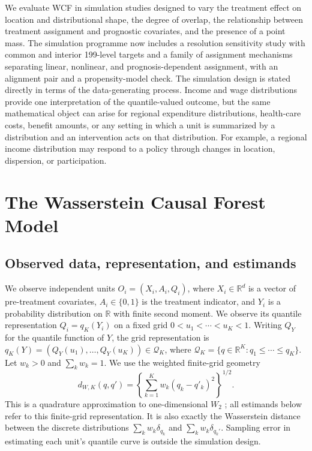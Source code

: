 \documentclass[11pt]{article}
\begin{document}
We evaluate WCF in simulation studies designed to vary the treatment effect on location and distributional shape, the degree of overlap, the relationship between treatment assignment and prognostic covariates, and the presence of a point mass. The simulation programme now includes a resolution sensitivity study with common and interior 199-level targets and a family of assignment mechanisms separating linear, nonlinear, and prognosis-dependent assignment, with an alignment pair and a propensity-model check. The simulation design is stated directly in terms of the data-generating process. Income and wage distributions provide one interpretation of the quantile-valued outcome, but the same mathematical object can arise for regional expenditure distributions, health-care costs, benefit amounts, or any setting in which a unit is summarized by a distribution and an intervention acts on that distribution. For example, a regional income distribution may respond to a policy through changes in location, dispersion, or participation.

\section{The Wasserstein Causal Forest Model}\label{sec:model}

\subsection{Observed data, representation, and estimands}\label{sec:setup}

We observe independent units $O_i=(X_i,A_i,Q_i)$, where $X_i\in
\mathbb{R}^{d}$ is a vector of pre-treatment covariates, $A_i\in\{0,1\}$ is
the treatment indicator, and $Y_i$ is a probability distribution on $\mathbb{R}$ with finite second moment. We observe its quantile representation $Q_i=q_K(Y_i)$ on a
fixed grid $0<u_1<\cdots<u_K<1$. Writing $Q_Y$ for the quantile function of $Y$, the grid representation is
$q_K(Y)=(Q_Y(u_1),\ldots,Q_Y(u_K))\in\mathcal{Q}_K$, where
$\mathcal{Q}_K=\{q\in\mathbb{R}^K:q_1\leq\cdots\leq q_K\}$. Let
$w_k>0$ and $\sum_k w_k=1$. We use the weighted finite-grid geometry
\[
 d_{W,K}(q,q')=\left\{\sum_{k=1}^{K}w_k(q_k-q'_k)^2\right\}^{1/2}.
\]
This is a quadrature approximation to one-dimensional $W_2$
\citep{peyre2019optimaltransport}; all
estimands below refer to this finite-grid representation. It is also exactly the Wasserstein distance between the discrete distributions $\sum_k w_k\delta_{q_k}$ and $\sum_k w_k\delta_{q_k'}$. Sampling error in estimating each unit's quantile curve is outside the simulation design.
\end{document}
